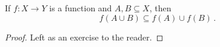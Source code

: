 \guard




\begin{prop}
\label{prop:functionAppliedToUnionIsUnionOfFunctionApplied}
  If $f:X\to Y$ is a function and $A,B\subseteq X$, then \[ f(A\cup B )\subseteq f(A)\cup f(B)\,.\]
\end{prop}
\begin{proof}
  Left as an exercise to the reader.
\end{proof}
